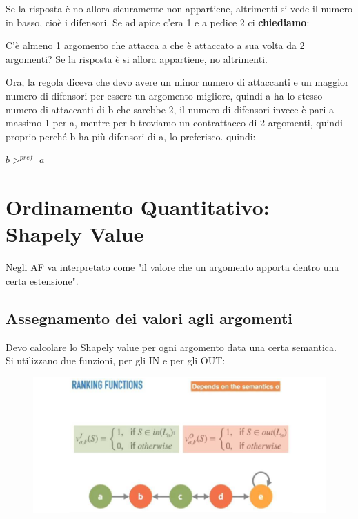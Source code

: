     \vspace{0.3cm}

    \noindent Se la risposta è no allora sicuramente non appartiene, altrimenti
    si vede il numero in basso, cioè i difensori.
    \vspace{0.3cm}
    \noindent Se ad apice c'era 1 e a pedice 2 ci \textbf{chiediamo}:

    \vspace{0.3cm}

    \noindent C'è almeno 1 argomento che attacca a che è attaccato a sua volta
    da 2 argomenti? Se la risposta è si allora appartiene, no altrimenti.

    \vspace{0.3cm}

    \noindent Ora, la regola diceva che devo avere un minor numero di attaccanti
    e un maggior numero di difensori per essere un argomento migliore, quindi a
    ha lo stesso numero di attaccanti di b che sarebbe 2, il numero di difensori
    invece è pari a massimo 1 per a, mentre per b troviamo un contrattacco di 2
    argomenti, quindi proprio perché b ha più difensori di a, lo preferisco.
    quindi:
    \begin{center}
        $b >^{pref}$ $a$
    \end{center}
    \section{Ordinamento Quantitativo: Shapely Value}
    Negli AF va interpretato come "il valore che un argomento apporta dentro una
    certa estensione".
    \subsection{Assegnamento dei valori agli argomenti}
    Devo calcolare lo Shapely value per ogni argomento data una certa semantica.
    \\
    Si utilizzano due funzioni, per gli IN e per gli OUT:
    \begin{figure}[htp]
        \centering
        \includegraphics[width=13cm, keepaspectratio]{img/Cap8/ordinamento-quantitativo.png}
    \end{figure}

